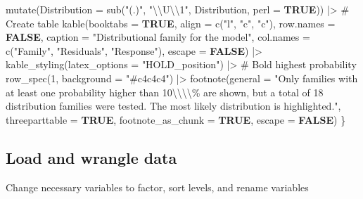 \documentclass[
  bookmarksnumbered]{article}
\newenvironment{Shaded}{\begin{snugshade}}{\end{snugshade}}
\newcommand{\AttributeTok}[1]{\textcolor[rgb]{0.80,0.80,0.80}{#1}}
\newcommand{\CommentTok}[1]{\textcolor[rgb]{0.50,0.62,0.50}{#1}}
\newcommand{\ConstantTok}[1]{\textcolor[rgb]{0.86,0.64,0.64}{\textbf{#1}}}
\newcommand{\DecValTok}[1]{\textcolor[rgb]{0.86,0.86,0.80}{#1}}
\newcommand{\FunctionTok}[1]{\textcolor[rgb]{0.94,0.94,0.56}{#1}}
\newcommand{\NormalTok}[1]{\textcolor[rgb]{0.80,0.80,0.80}{#1}}
\newcommand{\SpecialCharTok}[1]{\textcolor[rgb]{0.86,0.64,0.64}{#1}}
\newcommand{\StringTok}[1]{\textcolor[rgb]{0.80,0.58,0.58}{#1}}
\begin{document}
\begin{Shaded}
\begin{Highlighting}[]
  \FunctionTok{mutate}\NormalTok{(}\AttributeTok{Distribution =} \FunctionTok{sub}\NormalTok{(}\StringTok{"(.)"}\NormalTok{, }\StringTok{"}\SpecialCharTok{\textbackslash{}\textbackslash{}}\StringTok{U}\SpecialCharTok{\textbackslash{}\textbackslash{}}\StringTok{1"}\NormalTok{, Distribution, }\AttributeTok{perl =} \ConstantTok{TRUE}\NormalTok{)) }\SpecialCharTok{|\textgreater{}} 
  \CommentTok{\# Create table}
  \FunctionTok{kable}\NormalTok{(}\AttributeTok{booktabs =} \ConstantTok{TRUE}\NormalTok{, }
        \AttributeTok{align =} \FunctionTok{c}\NormalTok{(}\StringTok{"l"}\NormalTok{, }\StringTok{"c"}\NormalTok{, }\StringTok{"c"}\NormalTok{),}
        \AttributeTok{row.names =} \ConstantTok{FALSE}\NormalTok{,}
        \AttributeTok{caption =} \StringTok{"Distributional family for the model"}\NormalTok{,}
        \AttributeTok{col.names =} \FunctionTok{c}\NormalTok{(}\StringTok{"Family"}\NormalTok{,}
                      \StringTok{"Residuals"}\NormalTok{, }
                      \StringTok{"Response"}\NormalTok{),}
        \AttributeTok{escape =} \ConstantTok{FALSE}\NormalTok{) }\SpecialCharTok{|\textgreater{}} 
  \FunctionTok{kable\_styling}\NormalTok{(}\AttributeTok{latex\_options =} \StringTok{"HOLD\_position"}\NormalTok{) }\SpecialCharTok{|\textgreater{}}
  \CommentTok{\# Bold highest probability}
  \FunctionTok{row\_spec}\NormalTok{(}\DecValTok{1}\NormalTok{, }\AttributeTok{background =} \StringTok{"\#c4c4c4"}\NormalTok{) }\SpecialCharTok{|\textgreater{}}
  \FunctionTok{footnote}\NormalTok{(}\AttributeTok{general =} \StringTok{"Only families with at least one probability higher than }
\StringTok{  10}\SpecialCharTok{\textbackslash{}\textbackslash{}\textbackslash{}\textbackslash{}}\StringTok{\% are shown, but a total of 18 distribution families were tested.}
\StringTok{  The most likely distribution is highlighted."}\NormalTok{, }
           \AttributeTok{threeparttable =} \ConstantTok{TRUE}\NormalTok{,}
           \AttributeTok{footnote\_as\_chunk =} \ConstantTok{TRUE}\NormalTok{,}
           \AttributeTok{escape =} \ConstantTok{FALSE}\NormalTok{)}
\NormalTok{\}}
\end{Highlighting}
\end{Shaded}

\subsection{Load and wrangle data}\label{load-and-wrangle-data}

Change necessary variables to factor, sort levels, and rename variables
\end{document}
